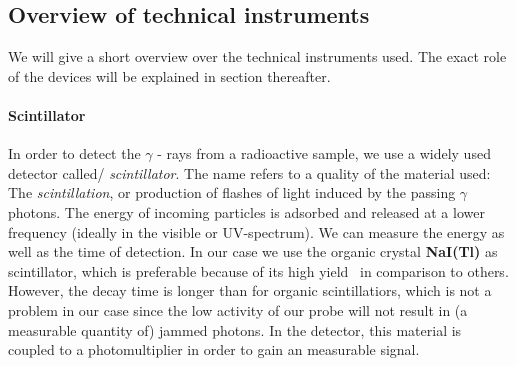 \subsection{Overview of technical instruments}
We will give a short overview over the technical instruments used. The exact role 
of the devices will be explained in section thereafter.
\label{sub:overview_of_technical_instruments}
\paragraph{Scintillator}
In order to detect the $\gamma$ - rays from a radioactive sample, we use a widely used detector called/
\emph{scintillator}. The name refers to a quality of the material used: The \emph{scintillation}, or production 
of flashes of light induced by the passing $\gamma$ photons. 
The energy of incoming particles
is adsorbed and released at a lower frequency (ideally in the visible or UV-spectrum). 
We can measure the energy as well as the time of detection. 
In our case we use the organic crystal \textbf{NaI(Tl)} as scintillator, which
is preferable because of its high yield~\cite{ver} in comparison to others. However, the decay time is longer
than for organic scintillatiors, which is not a problem in our case since the low activity of our probe will
not result in (a measurable quantity of) jammed photons.
In the detector, this material is coupled to a photomultiplier in order
to gain an measurable signal. 

